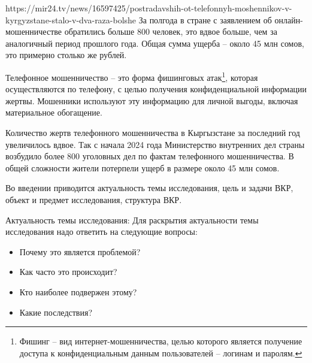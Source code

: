 https://mir24.tv/news/16597425/postradavshih-ot-telefonnyh-moshennikov-v-kyrgyzstane-stalo-v-dva-raza-bolshe
За полгода в стране с заявлением об онлайн-мошенничестве обратились больше 800 человек, это вдвое больше, чем за аналогичный период прошлого года. Общая сумма ущерба – около 45 млн сомов, это примерно столько же рублей.

Телефонное мошенничество – это форма фишинговых атак\footnote{Фишинг –  вид интернет-мошенничества, целью которого является получение доступа к конфиденциальным данным пользователей – логинам и паролям.}, которая осуществляются по телефону, с целью получения конфиденциальной информации жертвы. Мошенники используют эту информацию для личной выгоды, включая материальное обогащение.

Количество жертв телефонного мошенничества в Кыргызстане за последний год увеличилось вдвое. Так с начала 2024 года Министерство внутренних дел страны возбудило более 800 уголовных дел по фактам телефонного мошенничества. В общей сложности жители потерпели ущерб в размере около 45 млн сомов.

Во введении приводится актуальность темы исследования, цель и задачи ВКР, объект и предмет исследования, структура ВКР.

Актуальность темы исследования:
Для раскрытия актуальности темы исследования надо ответить на следующие вопросы:
\begin{itemize}
	\item Почему это является проблемой?
	\item Как часто это происходит?
	\item Кто наиболее подвержен этому?
	\item Какие последствия?
\end{itemize}

\newpage